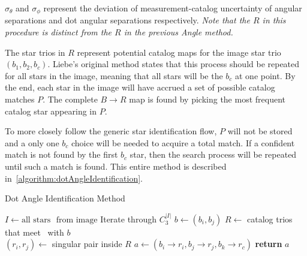 $\sigma_{\theta}$ and $\sigma_{\phi}$ represent the deviation of measurement-catalog uncertainty of angular separations
and dot angular separations respectively.
\textit{Note that the $R$ in this procedure is distinct from the $R$ in the previous Angle method.}

The star trios in $R$ represent potential catalog maps for the image star trio $(b_1, b_2, b_c)$.
Liebe's original method states that this process should be repeated for all stars in the image, meaning that all
stars will be the $b_c$ at one point.
By the end, each star in the image will have accrued a set of possible catalog matches $P$.
The complete $B \rightarrow R$ map is found by picking the most frequent catalog star appearing in $P$.

To more closely follow the generic star identification flow, $P$ will not be stored and a only one $b_c$ choice will be
needed to acquire a total match.
If a confident match is not found by the first $b_c$ star, then the search process will be repeated until such a
match is found.
This entire method is described in~\autoref{algorithm:dotAngleIdentification}.

\begin{algorithm} 
    \caption{Dot Angle Identification Method} \label{algorithm:dotAngleIdentification}
    \begin{algorithmic}[1]
        \State $I \gets \text{all stars } \text{ from image}$
          \Comment Iterate through $C^{|I|}_3$
        \State $b \gets (b_i, b_j)$
        \State $R \gets $ catalog trios that meet~ with $b$
        \\
        \State $(r_i, r_j) \gets $ singular pair inside $R$
        \State $a \gets (b_i \rightarrow r_i, b_j \rightarrow r_j, b_k \rightarrow r_c)$
        \State \textbf{return} $a$
        \EndIf
        \EndFor
        \EndFor
        \EndFor
        \EndProcedure
    \end{algorithmic}
\end{algorithm}

